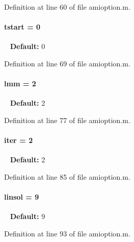 Definition at line 60 of file amioption.\+m.

\hypertarget{classamioption_a18a69d8713604897ca9ee705d9d4fc4a}{}
\paragraph[{tstart}]{\setlength{\rightskip}{0pt plus 5cm}tstart = 0}\label{classamioption_a18a69d8713604897ca9ee705d9d4fc4a}
~\newline
{\bfseries Default\+:} 0 

Definition at line 69 of file amioption.\+m.

\hypertarget{classamioption_a6f4b21b13e0c8c531c452c70b43fc96a}{}
\paragraph[{lmm}]{\setlength{\rightskip}{0pt plus 5cm}lmm = 2}\label{classamioption_a6f4b21b13e0c8c531c452c70b43fc96a}
~\newline
{\bfseries Default\+:} 2 

Definition at line 77 of file amioption.\+m.

\hypertarget{classamioption_a1fc3ae6bd5c6a80e9b81b27fc7b7a11a}{}
\paragraph[{iter}]{\setlength{\rightskip}{0pt plus 5cm}iter = 2}\label{classamioption_a1fc3ae6bd5c6a80e9b81b27fc7b7a11a}
~\newline
{\bfseries Default\+:} 2 

Definition at line 85 of file amioption.\+m.

\hypertarget{classamioption_a06749b49eaa313f4d00f0115d3a7a7f3}{}
\paragraph[{linsol}]{\setlength{\rightskip}{0pt plus 5cm}linsol = 9}\label{classamioption_a06749b49eaa313f4d00f0115d3a7a7f3}
~\newline
{\bfseries Default\+:} 9 

Definition at line 93 of file amioption.\+m.

